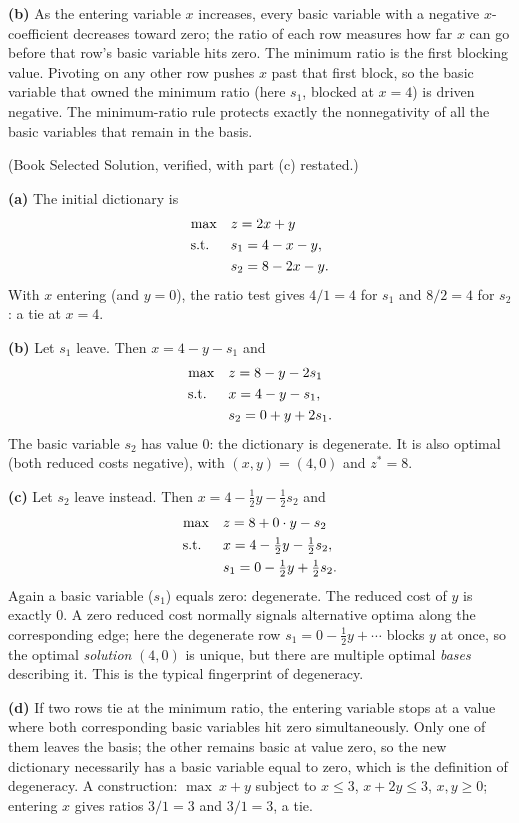 \textbf{(b)} As the entering variable $x$ increases, every basic variable
with a negative $x$-coefficient decreases toward zero; the ratio of each
row measures how far $x$ can go before that row's basic variable hits
zero. The minimum ratio is the first blocking value. Pivoting on any
other row pushes $x$ past that first block, so the basic variable that
owned the minimum ratio (here $s_1$, blocked at $x = 4$) is driven
negative. The minimum-ratio rule protects exactly the nonnegativity of
all the basic variables that remain in the basis.


(Book Selected Solution, verified, with part (c) restated.)

\textbf{(a)} The initial dictionary is
\[
\begin{aligned}
\max\quad & z = 2x + y \\
\text{s.t.}\;\;\quad & s_1 = 4 - x - y, \\
& s_2 = 8 - 2x - y.
\end{aligned}
\]
With $x$ entering (and $y = 0$), the ratio test gives $4/1 = 4$ for $s_1$
and $8/2 = 4$ for $s_2$: a tie at $x = 4$.

\textbf{(b)} Let $s_1$ leave. Then $x = 4 - y - s_1$ and
\[
\begin{aligned}
\max\quad & z = 8 - y - 2s_1 \\
\text{s.t.}\;\;\quad & x = 4 - y - s_1, \\
& s_2 = 0 + y + 2s_1.
\end{aligned}
\]
The basic variable $s_2$ has value $0$: the dictionary is degenerate. It
is also optimal (both reduced costs negative), with $(x, y) = (4, 0)$ and
$z^* = 8$.

\textbf{(c)} Let $s_2$ leave instead. Then
$x = 4 - \tfrac12 y - \tfrac12 s_2$ and
\[
\begin{aligned}
\max\quad & z = 8 + 0 \cdot y - s_2 \\
\text{s.t.}\;\;\quad & x = 4 - \tfrac12 y - \tfrac12 s_2, \\
& s_1 = 0 - \tfrac12 y + \tfrac12 s_2.
\end{aligned}
\]
Again a basic variable ($s_1$) equals zero: degenerate. The reduced cost
of $y$ is exactly $0$. A zero reduced cost normally signals alternative
optima along the corresponding edge; here the degenerate row
$s_1 = 0 - \tfrac12 y + \cdots$ blocks $y$ at once, so the optimal
\emph{solution} $(4, 0)$ is unique, but there are multiple optimal
\emph{bases} describing it. This is the typical fingerprint of degeneracy.

\textbf{(d)} If two rows tie at the minimum ratio, the entering variable
stops at a value where both corresponding basic variables hit zero
simultaneously. Only one of them leaves the basis; the other remains
basic at value zero, so the new dictionary necessarily has a basic
variable equal to zero, which is the definition of degeneracy. A
construction: $\max\ x + y$ subject to $x \leq 3$, $x + 2y \leq 3$,
$x, y \geq 0$; entering $x$ gives ratios $3/1 = 3$ and $3/1 = 3$, a tie.
